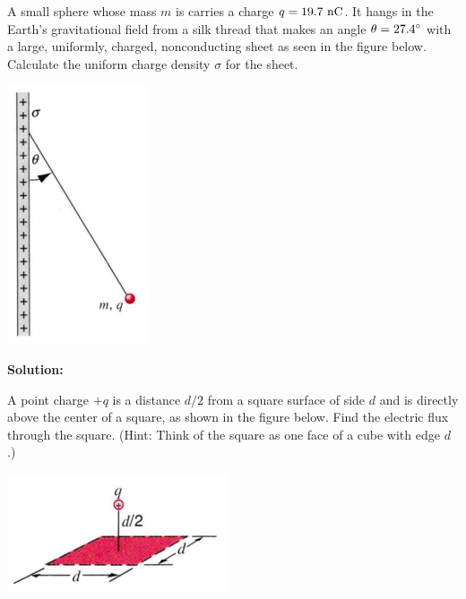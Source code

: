 \documentclass[11pt]{article}
\begin{document}
\vspace*{0.25in}


\begin{problem}[(P27.3)*]
A small sphere whose mass $m$ is  carries a charge $q=19.7~\mathrm{nC}$. It hangs in the Earth's gravitational field from a silk thread that makes an
angle $\theta = 27.4\degree$ with a large, uniformly, charged, nonconducting sheet as seen in the figure below. Calculate the uniform charge density $\sigma$ for the sheet.
\begin{center}
\includegraphics[scale=0.5]{prob1.png}
\end{center}
\end{problem}


\textbf{Solution:}


\clearpage
\begin{problem}[(E27.7)]
A point charge $+q$ is a distance $d/2$ from a square surface of side $d$ and is directly above the center of a square, as shown in the figure below. Find the electric flux through
the square. (Hint: Think of the square as one face of a cube with edge $d$.)
\begin{center}
\includegraphics[scale=0.75]{prob2.png}
\end{center}
\end{problem}
\end{document}
